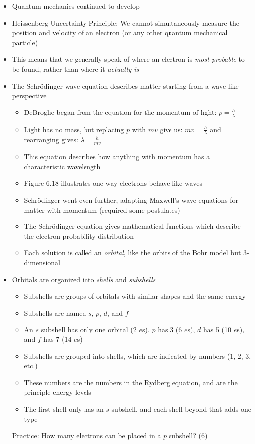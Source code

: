 \documentclass[12pt, openany, letterpaper]{memoir}
\begin{document}
\begin{itemize}
	\item Quantum mechanics continued to develop
	\item Heissenberg Uncertainty Principle: We cannot simultaneously measure the position and velocity of an electron (or any other quantum mechanical particle)
	\item This means that we generally speak of where an electron is \emph{most probable} to be found, rather than where it \emph{actually is}
	\item The Schr\"odinger wave equation describes matter starting from a wave-like perspective
	      \begin{itemize}
          \item DeBroglie began from the equation for the momentum of light: $p=\frac{h}{\lambda}$
          \item Light has no mass, but replacing $p$ with $mv$ give us: $mv = \frac{h}{\lambda}$ and rearranging gives: $\lambda=\frac{h}{mv}$
          \item This equation describes how anything with momentum has a characteristic wavelength
          \item Figure 6.18 illustrates one way electrons behave like waves
          \item Schr\"odinger went even further, adapting Maxwell's wave equations for matter with momentum (required some postulates)
		      \item The Schr\"odinger equation gives mathematical functions which describe the electron probability distribution
		      \item Each solution is called an \emph{orbital}, like the orbits of the Bohr model but 3-dimensional
	      \end{itemize}
	\item Orbitals are organized into \emph{shells} and \emph{subshells}
	      \begin{itemize}
		      \item Subshells are groups of orbitals with similar shapes and the same energy
		      \item Subshells are named $s$, $p$, $d$, and $f$
		      \item An $s$ subshell has only one orbital (2 $e$s), $p$ has 3 (6 $e$s), $d$ has 5 (10 $e$s), and $f$ has 7 (14 $e$s)
		      \item Subshells are grouped into shells, which are indicated by numbers ($1$, $2$, $3$, etc.)
		      \item These numbers are the numbers in the Rydberg equation, and are the principle energy levels
		      \item The first shell only has an $s$ subshell, and each shell beyond that adds one type
	      \end{itemize}
	      Practice: How many electrons can be placed in a $p$ subshell? ($6$)


\end{itemize}
\end{document}
